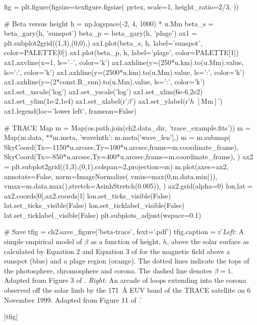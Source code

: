 \begin{pycode}[chapter2]
fig = plt.figure(figsize=texfigure.figsize(
    pytex,
    scale=1,
    height_ratio=2/3,
))

# Beta versus height
h = np.logspace(-2, 4, 1000) * u.Mm
beta_s = beta_gary(h, 'sunspot')
beta_p = beta_gary(h, 'plage')
ax1 = plt.subplot2grid((1,3),(0,0),)
ax1.plot(beta_s, h, label='sunspot', color=PALETTE[0])
ax1.plot(beta_p, h, label='plage', color=PALETTE[1])
ax1.axvline(x=1, ls='--', color='k')
ax1.axhline(y=(250*u.km).to(u.Mm).value, ls=':', color='k')
ax1.axhline(y=(2500*u.km).to(u.Mm).value, ls=':', color='k')
ax1.axhline(y=(2*const.R_sun).to(u.Mm).value, ls=':', color='k')
ax1.set_xscale('log')
ax1.set_yscale('log')
ax1.set_xlim(6e-6,2e2)
ax1.set_ylim(1e-2,1e4)
ax1.set_xlabel(r'$\beta$')
ax1.set_ylabel(r'$h$ $[\si{\mega\m}]$')
ax1.legend(loc='lower left', frameon=False)

# TRACE Map
m = Map(os.path.join(ch2.data_dir, 'trace_example.fits'))
m = Map(m.data, {**m.meta, 'wavelnth': m.meta['wave_len']},)
m = m.submap(
    SkyCoord(Tx=-1150*u.arcsec,Ty=100*u.arcsec,frame=m.coordinate_frame),
    SkyCoord(Tx=-850*u.arcsec,Ty=400*u.arcsec,frame=m.coordinate_frame),
)
ax2 = plt.subplot2grid((1,3),(0,1),colspan=2,projection=m)
m.plot(axes=ax2,
       annotate=False,
       norm=ImageNormalize(
           vmin=max(0,m.data.min()),
           vmax=m.data.max(),stretch=AsinhStretch(0.005)),
)
ax2.grid(alpha=0)
lon,lat = ax2.coords[0],ax2.coords[1]
lon.set_ticks_visible(False)
lat.set_ticks_visible(False)
lon.set_ticklabel_visible(False)
lat.set_ticklabel_visible(False)
plt.subplots_adjust(wspace=0.1)

# Save
tfig = ch2.save_figure('beta-trace', fext='.pdf')
tfig.caption = r'\textit{Left:} A simple empirical model of $\beta$ as a function of height, $h$, above the solar surface as calculated by Equation 2 and Equation 3 of \citet{gary_plasma_2001} for the magnetic field above a sunspot (blue) and a plage region (orange). The dotted lines indicate the tops of the photosphere, chromosphere and corona. The dashed line denotes $\beta=1$. Adapted from Figure 3 of \citet{gary_plasma_2001}. \textit{Right:} An arcade of loops extending into the corona observed off the solar limb by the \SI{171}{\angstrom} EUV band of the TRACE satellite on 6 November 1999. Adapted from Figure 11 of \citet{reale_coronal_2010}.'
\end{pycode}
\py[chapter2]|tfig|

